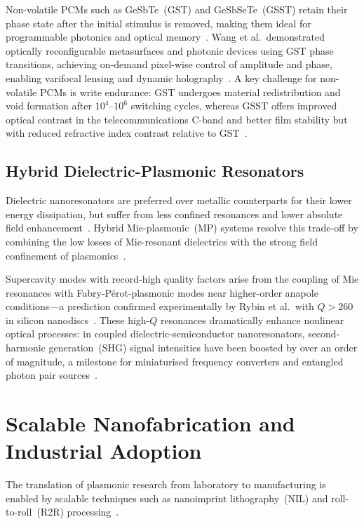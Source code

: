 \documentclass[twocolumn,10pt]{article}
\begin{document}
Non-volatile PCMs such as GeSbTe~(GST) and GeSbSeTe~(GSST) retain their
phase state after the initial stimulus is removed, making them ideal for
programmable photonics and optical memory~\cite{wang2016optically}.
Wang et al.\ demonstrated optically reconfigurable metasurfaces and
photonic devices using GST phase transitions, achieving on-demand pixel-wise
control of amplitude and phase, enabling varifocal lensing and dynamic
holography~\cite{wang2016optically,shaltout2019spatiotemporal}.  A
key challenge for non-volatile PCMs is write endurance: GST undergoes
material redistribution and void formation after $10^4$--$10^6$ switching
cycles, whereas GSST offers improved optical contrast in the
telecommunications C-band and better film stability but with reduced
refractive index contrast relative to GST~\cite{wang2016optically}.

\subsection{Hybrid Dielectric-Plasmonic Resonators}

Dielectric nanoresonators are preferred over metallic counterparts for
their lower energy dissipation, but suffer from less confined resonances
and lower absolute field enhancement~\cite{giannini2011plasmonic}.
Hybrid Mie-plasmonic~(MP) systems resolve this trade-off by combining
the low losses of Mie-resonant dielectrics with the strong field
confinement of plasmonics~\cite{giannini2011plasmonic}.

Supercavity modes with record-high quality factors arise from the
coupling of Mie resonances with Fabry-P\'erot-plasmonic modes near
higher-order anapole conditions---a prediction confirmed experimentally
by Rybin et al.\ with $Q > 260$ in silicon
nanodiscs~\cite{rybin2017highq}.  These high-$Q$ resonances dramatically
enhance nonlinear optical processes: in coupled dielectric-semiconductor
nanoresonators, second-harmonic generation~(SHG) signal intensities have
been boosted by over an order of magnitude, a milestone for miniaturised
frequency converters and entangled photon pair
sources~\cite{koshelev2020subwavelength}.

\section{Scalable Nanofabrication and Industrial Adoption}
\label{sec:fabrication}

The translation of plasmonic research from laboratory to manufacturing
is enabled by scalable techniques such as nanoimprint
lithography~(NIL) and roll-to-roll~(R2R)
processing~\cite{sreenivasan2008nanoscale,kooy2014review}.
\end{document}
